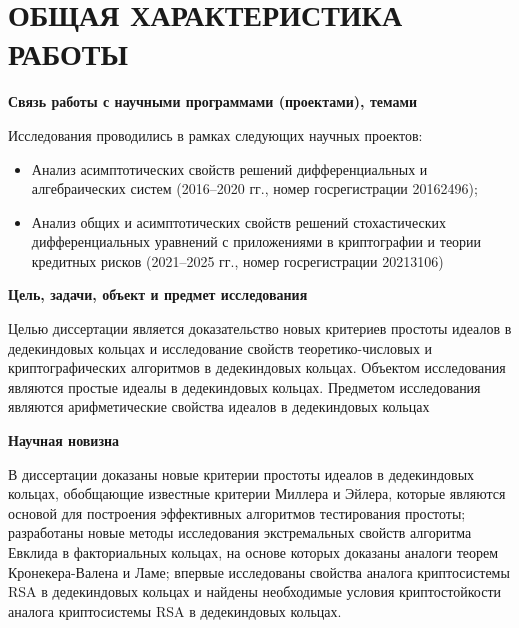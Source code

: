 \documentclass[_00_dissertation.tex]{subfiles}
\begin{document}
\onlyinsubfile{
    \renewcommand{\contentsname}{ОГЛАВЛЕНИЕ}
    \setcounter{tocdepth}{3}
    \tableofcontents
}

\chapter*{\MakeUppercase{Общая характеристика работы}}

\begin{center}
\textbf{Связь работы с научными программами (проектами), темами}
\end{center}

Исследования проводились в рамках следующих научных проектов:
\begin{itemize}
    \item Анализ асимптотических свойств решений дифференциальных и алгебраических систем (2016--2020 гг., номер госрегистрации 20162496);

    \item Анализ общих и асимптотических свойств решений стохастических дифференциальных уравнений с приложениями в криптографии и теории кредитных рисков (2021--2025 гг., номер госрегистрации 20213106)
\end{itemize}

\begin{center}
\textbf{Цель, задачи, объект и предмет исследования}
\end{center}

Целью диссертации является доказательство новых критериев простоты идеалов в дедекиндовых кольцах и исследование свойств теоретико-числовых и криптографических алгоритмов в дедекиндовых кольцах.
Объектом исследования являются простые идеалы в дедекиндовых кольцах.
Предметом исследования являются арифметические свойства идеалов в дедекиндовых кольцах

\begin{center}
\textbf{Научная новизна}
\end{center}

В диссертации доказаны новые критерии простоты идеалов в дедекиндовых кольцах, обобщающие известные критерии Миллера и Эйлера, которые являются основой для построения эффективных алгоритмов тестирования простоты; разработаны новые методы исследования экстремальных свойств алгоритма Евклида в факториальных кольцах, на основе которых доказаны аналоги теорем Кронекера-Валена и Ламе; впервые исследованы свойства аналога криптосистемы RSA в дедекиндовых кольцах и найдены необходимые условия криптостойкости аналога криптосистемы RSA в дедекиндовых кольцах.
\end{document}
